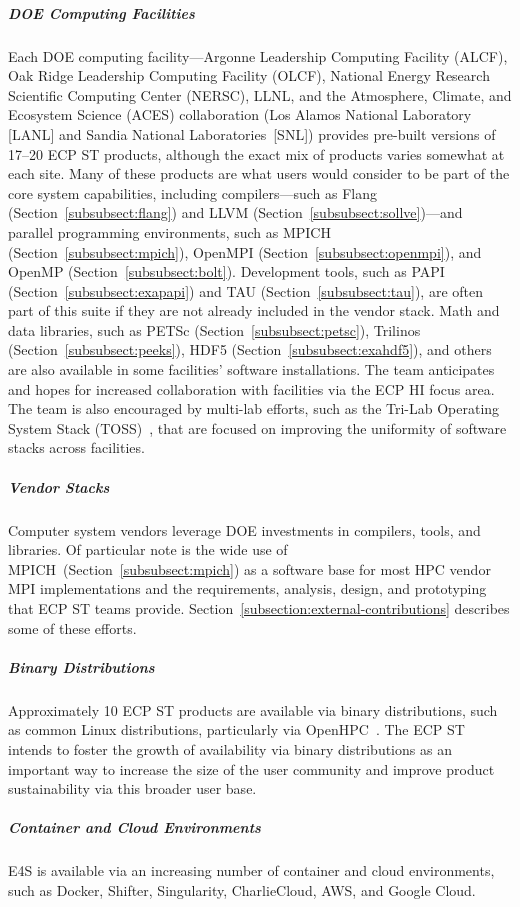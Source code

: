	\subparagraph{DOE Computing Facilities} Each DOE computing facility---Argonne Leadership Computing Facility (ALCF), Oak Ridge Leadership Computing Facility (OLCF), National Energy Research Scientific Computing Center (NERSC), LLNL, and the Atmosphere, Climate, and Ecosystem Science (ACES) collaboration (Los Alamos National Laboratory [LANL] and Sandia National Laboratories~[SNL]) provides pre-built versions of 17--20 ECP ST products, although the exact mix of products varies somewhat at each site. Many of these products are what users would consider to be part of the core system capabilities, including compilers---such as Flang (Section~\ref{subsubsect:flang}) and LLVM (Section~\ref{subsubsect:sollve})---and parallel programming environments, such as MPICH (Section~\ref{subsubsect:mpich}), OpenMPI (Section~\ref{subsubsect:openmpi}), and OpenMP (Section~\ref{subsubsect:bolt}).  Development tools, such as PAPI (Section~\ref{subsubsect:exapapi}) and TAU (Section~\ref{subsubsect:tau}), are often part of this suite if they are not already included in the vendor stack. Math and data libraries, such as PETSc (Section~\ref{subsubsect:petsc}), Trilinos (Section~\ref{subsubsect:peeks}), HDF5 (Section~\ref{subsubsect:exahdf5}), and others are also available in some facilities' software installations. The team anticipates and hopes for increased collaboration with facilities via the ECP HI focus area.  The team is also encouraged by multi-lab efforts, such as the Tri-Lab Operating System Stack (TOSS)~\cite{TOSS}, that are focused on improving the uniformity of software stacks across facilities.
	\subparagraph{Vendor Stacks} Computer system vendors leverage DOE investments in compilers, tools, and libraries.  Of particular note is the wide use of MPICH~(Section~\ref{subsubsect:mpich}) as a software base for most HPC vendor MPI implementations and the requirements, analysis, design, and prototyping that ECP ST teams provide.  Section~\ref{subsection:external-contributions} describes some of these efforts.
	\subparagraph{Binary Distributions} Approximately 10 ECP ST products are available via binary distributions, such as common Linux distributions, particularly via OpenHPC~\cite{OpenHPC}. The ECP ST intends to foster the growth of availability via binary distributions as an important way to increase the size of the user community and improve product sustainability via this broader user base.  
	\subparagraph{Container and Cloud Environments} E4S is available via an increasing number of container and cloud environments, such as Docker, Shifter, Singularity, CharlieCloud, AWS, and Google Cloud.


